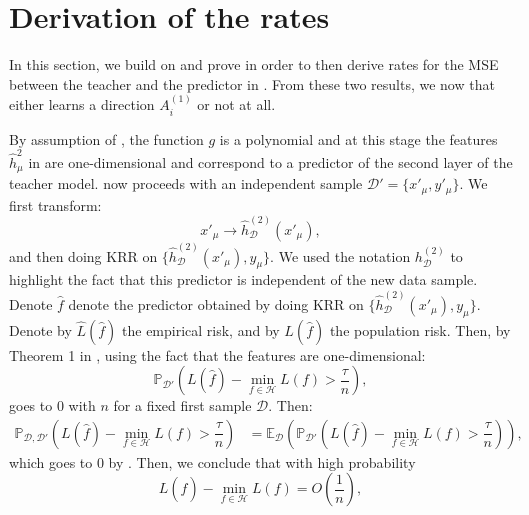 \documentclass[]{article}
\numberwithin{equation}{section}
\theoremstyle{definition}
\newcommand{\EE}{\mathbb{E}}
\begin{document}
\section{Derivation of the rates}
\label{section:derivation_rates}
In this section, we build on  and prove  in order to then derive rates for the MSE between the teacher and the predictor in . 
From these two results, we now that   either learns a direction $A_{i}^{(1)}$ or not at all. 

By assumption of , the function $g$ is a polynomial and at this stage the features $\hat{h}^{2}_\mu$ in  are one-dimensional and correspond to a predictor of the second layer of the teacher model.   now proceeds with an independent sample $\mathcal{D'} = \{ x'_\mu, y'_\mu \}$. We first transform: 
\begin{equation}
    x'_\mu \to \hat{h}^{(2)}_\mathcal{D} (x'_\mu),
\end{equation}
and then doing KRR on $\{ \hat{h}^{(2)}_{\mathcal{D}}(x'_\mu), y_\mu \}$. We used the notation $h^{(2)}_\mathcal{D}$ to highlight the fact that this predictor is independent of the new data sample. Denote $\hat{f}$ denote the predictor obtained by doing KRR on $\{ \hat{h}^{(2)}_{\mathcal{D}}(x'_\mu), y_\mu \}$. Denote by $\hat{L}(\hat{f})$ the empirical risk, and by $L(\hat{f})$ the population risk. Then, by Theorem 1 in \cite{caponnetto2007optimal}, using the fact that the features are one-dimensional: 
\begin{equation}
    \mathbb{P}_{\mathcal{D'}} \left( L(\hat{f}) - \min_{f \in \mathcal{H}}L(f) > \dfrac{\tau}{n} \right ),
    \label{conditioning_probability}
\end{equation}
goes to $0$ with $n$ for a fixed first sample $\mathcal{D}$. Then: 
\begin{align}
    \mathbb{P}_{\mathcal{D},\mathcal{D}'} \left ( L(\hat{f}) - \min_{f \in \mathcal{H}}L(f) > \dfrac{\tau}{n}\right ) & = \EE_{\mathcal{D}} \left (  \mathbb{P}_{\mathcal{D'}} \left( L(\hat{f}) - \min_{f \in \mathcal{H}}L(f) > \dfrac{\tau}{n} \right )\right ),
\end{align}
which goes to $0$ by . Then, we conclude that with high probability 
\begin{equation}
    L(\hat{f}) - \min_{f \in \mathcal{H}}L(f) = O(\dfrac{1}{n}),
\end{equation}
\end{document}
